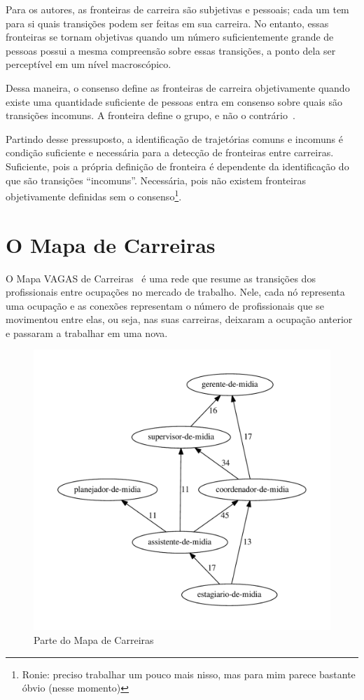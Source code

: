 \documentclass[
  article,
  11pt,
  a4paper,
  english,
  brazil,
  sumario=tradicional]{abntex2}
\begin{document}
Para os autores, as fronteiras de carreira são subjetivas e pessoais; cada um tem para si quais transições podem ser feitas em sua carreira. No entanto, essas fronteiras se tornam objetivas quando um número suficientemente grande de pessoas possui a mesma compreensão sobre essas transições, a ponto dela ser perceptível em um nível macroscópico.

Dessa maneira, o consenso define as fronteiras de carreira objetivamente quando existe uma quantidade suficiente de pessoas entra em consenso sobre quais são transições incomuns. A fronteira define o grupo, e não o contrário~\cite{Gunz2007-hr}.

Partindo desse pressuposto, a identificação de trajetórias comuns e incomuns é condição suficiente e necessária para a detecção de fronteiras entre carreiras. Suficiente, pois a própria definição de fronteira é dependente da identificação do que são transições \enquote{incomuns}. Necessária, pois não existem fronteiras objetivamente definidas sem o consenso\footnote{Ronie: preciso trabalhar um pouco mais nisso, mas para mim parece bastante óbvio (nesse momento)}.

\section{O Mapa de Carreiras} \label{sec:mapa}

O Mapa VAGAS de Carreiras~\cite{VAGAS_Tecnologia2015-yv} é uma rede que resume as transições dos profissionais entre ocupações no mercado de trabalho. Nele, cada nó representa uma ocupação e as conexões representam o número de profissionais que se movimentou entre elas, ou seja, nas suas carreiras, deixaram a ocupação anterior e passaram a trabalhar em uma nova.

\begin{figure}[ht]
  \centering
  \includegraphics[scale=0.6]{cluster_23.pdf}
  \caption{Parte do Mapa de Carreiras}
  \label{fig:ex-mapa-midia}
\end{figure}
\end{document}
